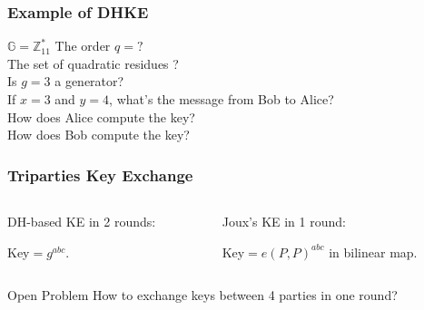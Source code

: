 \begin{frame}\frametitle{Example of DHKE}
\begin{exampleblock}{$\mathbb{G} = \mathbb{Z}^*_{11}$}
The order $q = ?$\\ %
The set of quadratic residues ?\\ %
Is $g = 3$ a generator? \\ %
If $x = 3$ and $y = 4$, what's the message from Bob to Alice?\\ %
How does Alice compute the key?\\ %
How does Bob compute the key? %
\end{exampleblock}
\end{frame}
\begin{frame}\frametitle{Triparties Key Exchange}
\begin{columns}[]
\begin{column}{5cm}
\begin{center}
DH-based KE in 2 rounds:
\begin{figure}

\end{figure}
Key$=g^{abc}$.
\end{center}
\end{column}
\begin{column}{6cm}
\begin{center}
Joux's KE in 1 round:
\begin{figure}

\end{figure}
Key$=e(P,P)^{abc}$ in bilinear map.
\end{center}
\end{column}
\end{columns}
\begin{block}{Open Problem}
How to exchange keys between 4 parties in one round?
\end{block}
\end{frame}
